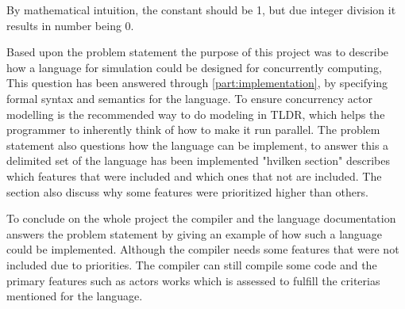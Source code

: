 By mathematical intuition, the constant should be 1, but due integer division it results in number being 0.

Based upon the problem statement the purpose of this project was to describe how a language for simulation could be designed for concurrently computing, This question has been answered through \cref{part:implementation}, by specifying formal syntax and semantics for the language.
To ensure concurrency actor modelling is the recommended way to do modeling in TLDR, which helps the programmer to inherently think of how to make it run parallel.
The problem statement also questions how the language can be implement, to answer this a delimited set of the language has been implemented "hvilken section" describes which features that were included and which ones that not are included. The section also discuss why some features were prioritized higher than others.

To conclude on the whole project the compiler and the language documentation answers the problem statement by giving an example of how such a language could be implemented. Although the compiler needs some features that were not included due to priorities. The compiler can still compile some code and the primary features such as actors works which is assessed to fulfill the criterias mentioned for the language.










